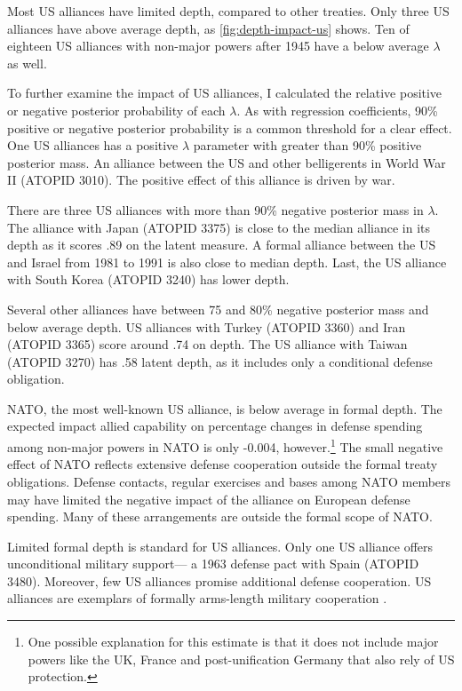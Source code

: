 \documentclass[12pt]{article}
\begin{document}
Most US alliances have limited depth, compared to other treaties. 
Only three US alliances have above average depth, as \autoref{fig:depth-impact-us} shows. 
Ten of eighteen US alliances with non-major powers after 1945 have a below average $\lambda$ as well. 


To further examine the impact of US alliances, I calculated the relative positive or negative posterior probability of each $\lambda$. 
As with regression coefficients, 90\% positive or negative posterior probability is a common threshold for a clear effect. 
One US alliances has a positive $\lambda$ parameter with greater than 90\% positive posterior mass. 
An alliance between the US and other belligerents in World War II (ATOPID 3010). 
The positive effect of this alliance is driven by war.  


There are three US alliances with more than 90\% negative posterior mass in $\lambda$. 
The alliance with Japan (ATOPID 3375) is close to the median alliance in its depth as it scores .89 on the latent measure. 
A formal alliance between the US and Israel from 1981 to 1991 is also close to median depth. 
Last, the US alliance with South Korea (ATOPID 3240) has lower depth. 


Several other alliances have between 75 and 80\% negative posterior mass and below average depth. 
US alliances with Turkey (ATOPID 3360) and Iran (ATOPID 3365)  score around .74 on depth. 
The US alliance with Taiwan (ATOPID 3270) has .58 latent depth, as it includes only a conditional defense obligation.  


NATO, the most well-known US alliance, is below average in formal depth. 
The expected impact allied capability on percentage changes in defense spending among non-major powers in NATO is only -0.004, however.\footnote{One possible explanation for this estimate is that it does not include major powers like the UK, France and post-unification Germany that also rely of US protection.}
The small negative effect of NATO reflects extensive defense cooperation outside the formal treaty obligations. 
Defense contacts, regular exercises and bases among NATO members may have limited the negative impact of the alliance on European defense spending. 
Many of these arrangements are outside the formal scope of NATO. 


Limited formal depth is standard for US alliances. 
Only one US alliance offers unconditional military support--- a 1963 defense pact with Spain (ATOPID 3480). 
Moreover, few US alliances promise additional defense cooperation. 
US alliances are exemplars of formally arms-length military cooperation \citep{Lake1996}. 
\end{document}
